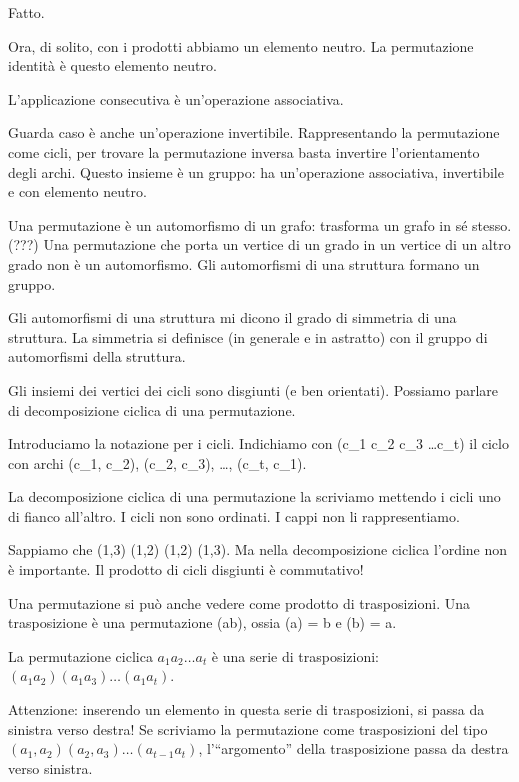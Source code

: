 Fatto.

Ora, di solito, con i prodotti abbiamo un elemento neutro.
La permutazione identit\`a \`e questo elemento neutro.

L'applicazione consecutiva \`e un'operazione associativa.


Guarda caso \`e anche un'operazione invertibile.
Rappresentando la permutazione come cicli, per trovare la permutazione inversa basta invertire l'orientamento degli archi.
Questo insieme \`e un gruppo: ha un'operazione associativa, invertibile e con elemento neutro.


Una permutazione \`e un automorfismo di un grafo: trasforma un grafo in s\'e stesso.
(???)
Una permutazione che porta un vertice di un grado in un vertice di un altro grado non \`e un automorfismo.
Gli automorfismi di una struttura formano un gruppo.

Gli automorfismi di una struttura mi dicono il grado di simmetria di una struttura.
La simmetria si definisce (in generale e in astratto) con il gruppo di automorfismi della struttura.

Gli insiemi dei vertici dei cicli sono disgiunti (e ben orientati).
Possiamo parlare di decomposizione ciclica di una permutazione.

Introduciamo la notazione per i cicli.
Indichiamo con (c_1 c_2 c_3 \dots c_t) il ciclo con archi (c_1, c_2), (c_2, c_3), \dots, (c_t, c_1).

La decomposizione ciclica di una permutazione la scriviamo mettendo i cicli uno di fianco all'altro.
I cicli non sono ordinati.
I cappi non li rappresentiamo.

Sappiamo che (1,3) (1,2) \neq (1,2) (1,3).
Ma nella decomposizione ciclica l'ordine non \`e importante.
Il prodotto di cicli disgiunti \`e commutativo!

Una permutazione si pu\`o anche vedere come prodotto di trasposizioni.
Una trasposizione \tau \`e una permutazione (ab), ossia \tau(a) = b e \tau(b) = a.

\begin{oss}
	La permutazione ciclica $a_1 a_2 \dots a_t$ \`e una serie di trasposizioni: $(a_1 a_2) (a_1 a_3) \dots (a_1 a_t)$.
\end{oss}

Attenzione: inserendo un elemento in questa serie di trasposizioni, si passa da sinistra verso destra!
Se scriviamo la permutazione come trasposizioni del tipo $(a_1, a_2) (a_2, a_3) \dots (a_{t-1} a_{t})$, l'``argomento'' della trasposizione passa da destra verso sinistra.

